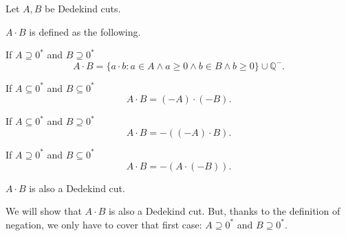 \begin{theorem}[Multiplication]
    \par Let $A, B$ be Dedekind cuts.
    \par $A\cdot B$ is defined as the following.
    \par If $A\supseteq{0}^{*}$ and $B\supseteq{0}^{*}$
    \[
        A\cdot B = \{ a\cdot b : a\in A\wedge a\ge 0 \wedge b\in B\wedge b\ge 0 \} \cup \mathbb{Q}^{-}.
    \]
    \par If $A\subseteq{0}^{*}$ and $B\subseteq{0}^{*}$
    \[
        A\cdot B = (-A)\cdot (-B).
    \]
    \par If $A\subseteq{0}^{*}$ and $B\supseteq{0}^{*}$
    \[
        A\cdot B = -\left((-A)\cdot B\right).
    \]
    \par If $A\supseteq{0}^{*}$ and $B\subseteq{0}^{*}$
    \[
        A\cdot B = -\left(A\cdot (-B)\right).
    \]
    \par $A\cdot B$ is also a Dedekind cut.
\end{theorem}

\par We will show that $A\cdot B$ is also a Dedekind cut. But, thanks to the definition of negation, we only have to cover that first case: $A\supseteq{0}^{*}$ and $B\supseteq{0}^{*}$.

